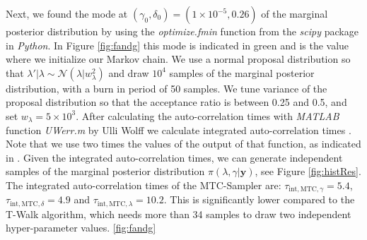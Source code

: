 Next, we found the mode at $(\gamma_0, \delta_0) = (1 \times 10^{-5}, 0.26)$ of the marginal posterior distribution by using the \textit{optimize.fmin} function from the \textit{scipy} package in \textit{Python}.
In Figure \ref{fig:fandg} this mode is indicated in green and is the value where we initialize our Markov chain.
We use a normal proposal distribution so that $\lambda' | \lambda \sim \mathcal{N}(\lambda| w^2_{\lambda})$ and draw $10^4$ samples of the marginal posterior distribution, with a burn in period of 50 samples.
We tune variance of the proposal distribution so that the acceptance ratio is between 0.25 and 0.5, and set $w_{\lambda} = 5\times 10^3$.
After calculating the auto-correlation times with \textit{MATLAB} function \textit{UWerr.m} by Ulli Wolff we calculate integrated auto-correlation times \cite{Uwerr}.
Note that we use two times the values of the output of that function, as indicated in \cite{fox2016fast}.
Given the integrated auto-correlation times, we can generate independent samples of the marginal posterior distribution $\pi(\lambda, \gamma | \bm{y})$, see Figure \ref{fig:histRes}.
The integrated auto-correlation times of the MTC-Sampler are: $\tau_{\text{int}, \text{MTC}, \gamma} = 5.4$, $\tau_{\text{int}, \text{MTC}, \delta} = 4.9$ and $\tau_{\text{int}, \text{MTC}, \lambda}= 10.2$.
This is significantly lower compared to the T-Walk algorithm, which needs more than 34 samples to draw two independent hyper-parameter values.
 \ref{fig:fandg}

